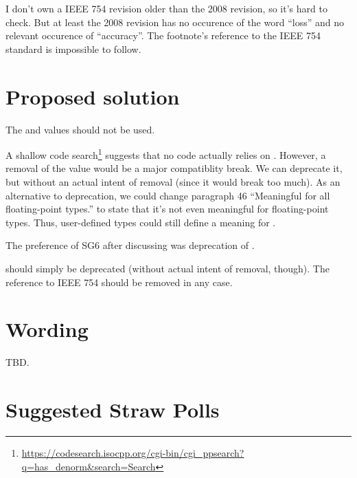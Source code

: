 I don't own a IEEE 754 revision older than the 2008 revision, so it's hard to check. But 
at least the 2008 revision has no occurence of the word “loss” and no relevant occurence 
of “accuracy”. The footnote's reference to the IEEE 754 standard is impossible to follow.

\section{Proposed solution}

The  and  values should not be used.

A shallow code 
search\footnote{\url{https://codesearch.isocpp.org/cgi-bin/cgi_ppsearch?q=has_denorm&search=Search}} 
suggests that no code actually relies on . However, a removal of the 
value would be a major compatiblity break. We can deprecate it, but without an actual 
intent of removal (since it would break too much). As an alternative to deprecation, we 
could change paragraph 46 “Meaningful for all floating-point types.” to state that it's 
not even meaningful for floating-point types. Thus, user-defined types could still define 
a meaning for .

The preference of SG6 after discussing \cite{WG14N2993} was deprecation of 
.

 should simply be deprecated (without actual intent of removal, 
though). The reference to IEEE 754 should be removed in any case.

\section{Wording}

TBD.

\section{Suggested Straw Polls}






